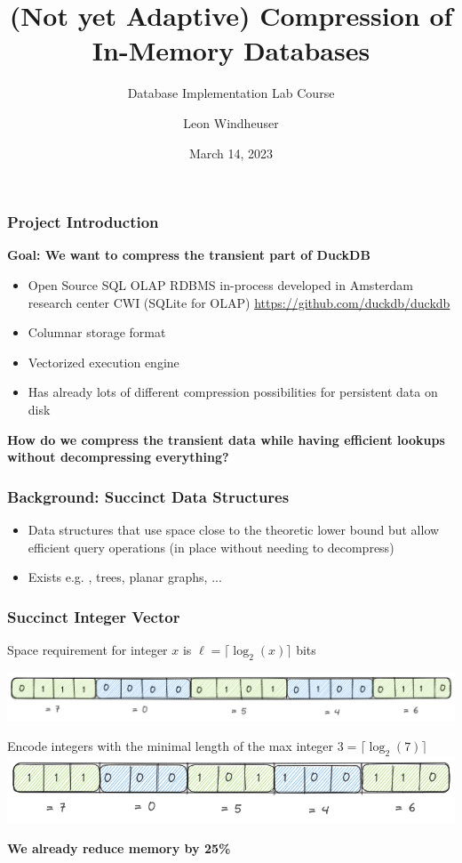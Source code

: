 \documentclass[aspectratio=43]{beamer}
\title{(Not yet Adaptive) Compression of In-Memory Databases}
\subtitle{Database Implementation Lab Course}
\author{Leon Windheuser}
\date{March 14, 2023}
\begin{document}
\frame{\titlepage}


\begin{frame}
    \frametitle{Project Introduction}
    \textbf{Goal: We want to compress the transient part of DuckDB}
    \pause

    \begin{itemize}
        \item Open Source SQL OLAP RDBMS in-process developed in Amsterdam research center CWI (SQLite for OLAP)
        \url{https://github.com/duckdb/duckdb}
        \item Columnar storage format
        \item Vectorized execution engine
        \item Has already lots of different compression possibilities for persistent data on disk 
    \end{itemize}

    \vspace{1cm}
    \pause
    \centering
    \textbf{How do we compress the transient data while having efficient lookups without decompressing everything?}
\end{frame}


\begin{frame}
    \frametitle{Background: Succinct Data Structures}
    
    \begin{itemize}
        \item Data structures that use space close to the theoretic lower bound but allow efficient query operations (in place without needing to decompress)
        \item Exists e.g. {}, trees, planar graphs, ...
    \end{itemize}
\end{frame}

\begin{frame}
    \frametitle{Succinct Integer Vector}
    \centering
    Space requirement for integer $x$ is $\ell = \lceil \log_2(x) \rceil$ bits

    \includegraphics[width=\framewidth]{figures/excalidraw/bit-int-vector.png}
    \pause

    Encode integers with the minimal length of the max integer $3 = \lceil \log_2(7) \rceil$ \\
    \vspace{0.5cm} 
    \includegraphics[width=0.75\framewidth]{figures/excalidraw/bit-compressed-int-vector.png}

    \vspace{0.5cm}
    \textbf{We already reduce memory by 25\%}
\end{frame}
\end{document}
